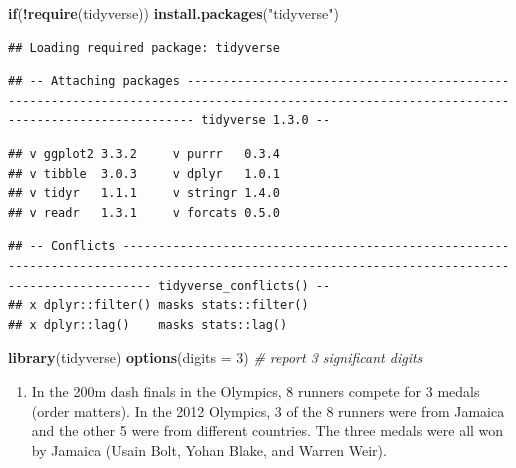 \documentclass[
]{article}
\newenvironment{Shaded}{\begin{snugshade}}{\end{snugshade}}
\newcommand{\CommentTok}[1]{\textcolor[rgb]{0.56,0.35,0.01}{\textit{#1}}}
\newcommand{\ControlFlowTok}[1]{\textcolor[rgb]{0.13,0.29,0.53}{\textbf{#1}}}
\newcommand{\DataTypeTok}[1]{\textcolor[rgb]{0.13,0.29,0.53}{#1}}
\newcommand{\DecValTok}[1]{\textcolor[rgb]{0.00,0.00,0.81}{#1}}
\newcommand{\KeywordTok}[1]{\textcolor[rgb]{0.13,0.29,0.53}{\textbf{#1}}}
\newcommand{\NormalTok}[1]{#1}
\newcommand{\OperatorTok}[1]{\textcolor[rgb]{0.81,0.36,0.00}{\textbf{#1}}}
\newcommand{\StringTok}[1]{\textcolor[rgb]{0.31,0.60,0.02}{#1}}
\providecommand{\tightlist}{%
  \setlength{\itemsep}{0pt}\setlength{\parskip}{0pt}}
\begin{document}
\begin{Shaded}
\begin{Highlighting}[]
\ControlFlowTok{if}\NormalTok{(}\OperatorTok{!}\KeywordTok{require}\NormalTok{(tidyverse)) }\KeywordTok{install.packages}\NormalTok{(}\StringTok{"tidyverse"}\NormalTok{)}
\end{Highlighting}
\end{Shaded}

\begin{verbatim}
## Loading required package: tidyverse
\end{verbatim}

\begin{verbatim}
## -- Attaching packages --------------------------------------------------------------------------------------------------------------------------------------------- tidyverse 1.3.0 --
\end{verbatim}

\begin{verbatim}
## v ggplot2 3.3.2     v purrr   0.3.4
## v tibble  3.0.3     v dplyr   1.0.1
## v tidyr   1.1.1     v stringr 1.4.0
## v readr   1.3.1     v forcats 0.5.0
\end{verbatim}

\begin{verbatim}
## -- Conflicts ------------------------------------------------------------------------------------------------------------------------------------------------ tidyverse_conflicts() --
## x dplyr::filter() masks stats::filter()
## x dplyr::lag()    masks stats::lag()
\end{verbatim}

\begin{Shaded}
\begin{Highlighting}[]
\KeywordTok{library}\NormalTok{(tidyverse)}
\KeywordTok{options}\NormalTok{(}\DataTypeTok{digits =} \DecValTok{3}\NormalTok{)    }\CommentTok{\# report 3 significant digits}
\end{Highlighting}
\end{Shaded}

\begin{enumerate}
\def\labelenumi{\arabic{enumi}.}
\tightlist
\item
  In the 200m dash finals in the Olympics, 8 runners compete for 3
  medals (order matters). In the 2012 Olympics, 3 of the 8 runners were
  from Jamaica and the other 5 were from different countries. The three
  medals were all won by Jamaica (Usain Bolt, Yohan Blake, and Warren
  Weir).
\end{enumerate}
\end{document}
